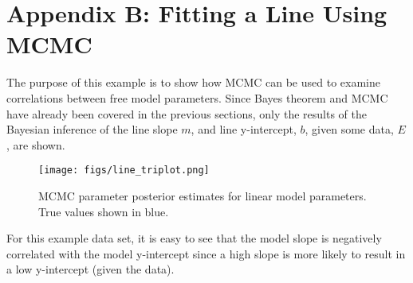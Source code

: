 \documentclass[10pt,a4paper]{report}
\begin{document}
\chapter{Appendix B: Fitting a Line Using MCMC}

The purpose of this example is to show how MCMC can be used to examine correlations between free model parameters.  Since Bayes theorem and MCMC have already been covered in the previous sections, only the results of the Bayesian inference of the line slope $m$, and line y-intercept, $b$, given some data, $E$, are shown.

\begin{figure}[h]
\centering
    \texttt{[image: figs/line\_triplot.png]}
    \caption{MCMC parameter posterior estimates for linear model parameters.  \\
    True values shown in blue.  \label{fig:line_triplot}}
\end{figure}

For this example data set, it is easy to see that the model slope is negatively correlated with the model y-intercept since a high slope is more likely to result in a low y-intercept (given the data).
\end{document}
